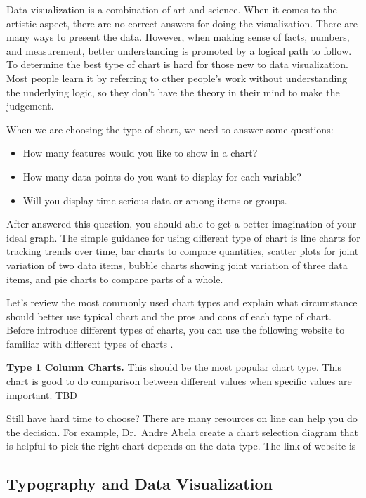 \documentclass[]{book}
\providecommand{\tightlist}{%
  \setlength{\itemsep}{0pt}\setlength{\parskip}{0pt}}
\theoremstyle{definition}
\theoremstyle{definition}
\theoremstyle{definition}
\theoremstyle{remark}
\begin{document}
Data visualization is a combination of art and science. When it comes to
the artistic aspect, there are no correct answers for doing the
visualization. There are many ways to present the data. However, when
making sense of facts, numbers, and measurement, better understanding is
promoted by a logical path to follow. To determine the best type of
chart is hard for those new to data visualization. Most people learn it
by referring to other people's work without understanding the underlying
logic, so they don't have the theory in their mind to make the
judgement.

When we are choosing the type of chart, we need to answer some
questions:

\begin{itemize}
\tightlist
\item
  How many features would you like to show in a chart?
\item
  How many data points do you want to display for each variable?
\item
  Will you display time serious data or among items or groups.
\end{itemize}

After answered this question, you should able to get a better
imagination of your ideal graph. The simple guidance for using different
type of chart is line charts for tracking trends over time, bar charts
to compare quantities, scatter plots for joint variation of two data
items, bubble charts showing joint variation of three data items, and
pie charts to compare parts of a whole.

Let's review the most commonly used chart types and explain what
circumstance should better use typical chart and the pros and cons of
each type of chart. Before introduce different types of charts, you can
use the following website to familiar with different types of charts
\citep{charts_viz}.

\textbf{Type 1 Column Charts.} This should be the most popular chart
type. This chart is good to do comparison between different values when
specific values are important. TBD

Still have hard time to choose? There are many resources on line can
help you do the decision. For example, Dr.~Andre Abela create a chart
selection diagram that is helpful to pick the right chart depends on the
data type. The link of website is

\subsection{Typography and Data
Visualization}\label{typography-and-data-visualization}
\end{document}
